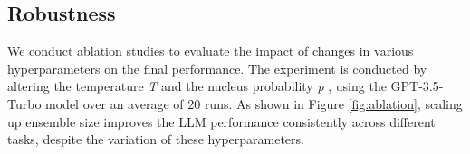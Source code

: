 
\subsection{Robustness} 

We conduct ablation studies to evaluate the impact of changes in various hyperparameters on the final performance. The experiment is conducted by altering the temperature \textit{T} \cite{temperature} and the nucleus probability \textit{p} \cite{neucler}, using the GPT-3.5-Turbo model over an average of 20 runs. As shown in Figure \ref{fig:ablation}, scaling up ensemble size improves the LLM performance consistently across different tasks, despite the variation of these hyperparameters.



